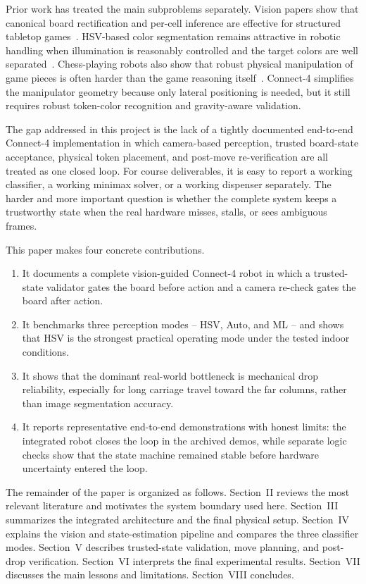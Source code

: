 \documentclass[conference]{IEEEtran}
\begin{document}
Prior work has treated the main subproblems separately. Vision papers show that canonical board rectification and per-cell inference are effective for structured tabletop games~\cite{Wolflein2021,Masouris2023}. HSV-based color segmentation remains attractive in robotic handling when illumination is reasonably controlled and the target colors are well separated~\cite{Akis2024}. Chess-playing robots also show that robust physical manipulation of game pieces is often harder than the game reasoning itself~\cite{Matuszek2011}. Connect-4 simplifies the manipulator geometry because only lateral positioning is needed, but it still requires robust token-color recognition and gravity-aware validation.

The gap addressed in this project is the lack of a tightly documented end-to-end Connect-4 implementation in which camera-based perception, trusted board-state acceptance, physical token placement, and post-move re-verification are all treated as one closed loop. For course deliverables, it is easy to report a working classifier, a working minimax solver, or a working dispenser separately. The harder and more important question is whether the complete system keeps a trustworthy state when the real hardware misses, stalls, or sees ambiguous frames.

This paper makes four concrete contributions.

\begin{enumerate}
\item It documents a complete vision-guided Connect-4 robot in which a trusted-state validator gates the board before action and a camera re-check gates the board after action.
\item It benchmarks three perception modes -- HSV, Auto, and ML -- and shows that HSV is the strongest practical operating mode under the tested indoor conditions.
\item It shows that the dominant real-world bottleneck is mechanical drop reliability, especially for long carriage travel toward the far columns, rather than image segmentation accuracy.
\item It reports representative end-to-end demonstrations with honest limits: the integrated robot closes the loop in the archived demos, while separate logic checks show that the state machine remained stable before hardware uncertainty entered the loop.
\end{enumerate}

The remainder of the paper is organized as follows. Section~II reviews the most relevant literature and motivates the system boundary used here. Section~III summarizes the integrated architecture and the final physical setup. Section~IV explains the vision and state-estimation pipeline and compares the three classifier modes. Section~V describes trusted-state validation, move planning, and post-drop verification. Section~VI interprets the final experimental results. Section~VII discusses the main lessons and limitations. Section~VIII concludes.
\end{document}

